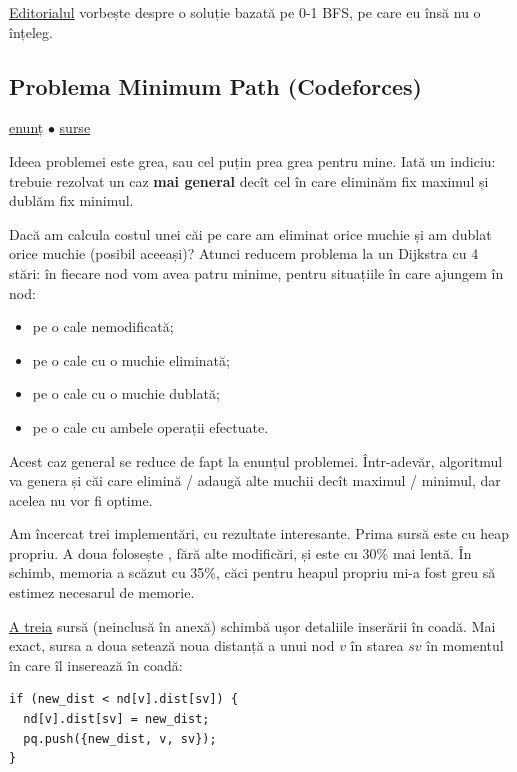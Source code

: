 \documentclass[../main.tex]{subfiles}
\begin{document}
\href{https://codeforces.com/blog/entry/76479}{Editorialul} vorbește despre o soluție bazată pe 0-1 BFS, pe care eu însă nu o înțeleg.

\subsection{Problema Minimum Path (Codeforces)}
\label{problem:minimum-path}

\href{https://codeforces.com/contest/1473/problem/E}{enunț}
$\bullet$
\hyperref[code:minimum-path]{surse}

Ideea problemei este grea, sau cel puțin prea grea pentru mine.  Iată un indiciu: trebuie rezolvat un caz \textbf{mai general} decît cel în care eliminăm fix maximul și dublăm fix minimul.

Dacă am calcula costul unei căi pe care am eliminat orice muchie și am dublat orice muchie (posibil aceeași)? Atunci reducem problema la un Dijkstra cu 4 stări: în fiecare nod vom avea patru minime, pentru situațiile în care ajungem în nod:

\begin{itemize}
  \item pe o cale nemodificată;
  \item pe o cale cu o muchie eliminată;
  \item pe o cale cu o muchie dublată;
  \item pe o cale cu ambele operații efectuate.
\end{itemize}

Acest caz general se reduce de fapt la enunțul problemei. Într-adevăr, algoritmul va genera și căi care elimină / adaugă alte muchii decît maximul / minimul, dar acelea nu vor fi optime.

Am încercat trei implementări, cu rezultate interesante. Prima sursă este cu heap propriu. A doua folosește , fără alte modificări, și este cu 30\% mai lentă. În schimb, memoria a scăzut cu 35\%, căci pentru heapul propriu mi-a fost greu să estimez necesarul de memorie.

\href{https://codeforces.com/contest/1473/submission/363749817}{A treia} sursă (neinclusă în anexă) schimbă ușor detaliile inserării în coadă. Mai exact, sursa a doua setează noua distanță a unui nod $v$ în starea $sv$ în momentul în care îl inserează în coadă:

\begin{verbatim}
if (new_dist < nd[v].dist[sv]) {
  nd[v].dist[sv] = new_dist;
  pq.push({new_dist, v, sv});
}
\end{verbatim}
\end{document}

